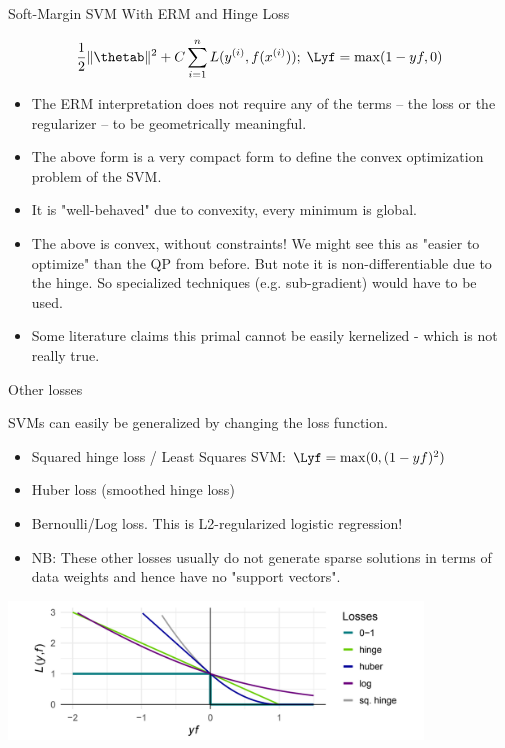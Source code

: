 \begin{vbframe}{Soft-Margin SVM With ERM and Hinge Loss}
\framebreak

  $$ \frac{1}{2} \|\thetab\|^2 + C \sumin \Lxyi ;\; \Lyf = \max(1-yf, 0)$$
\begin{itemize}
 \item  The ERM interpretation does not require any of the terms -- the loss or the regularizer -- to be geometrically meaningful.
  \item The above form is a very compact form to define the convex optimization problem of the SVM. 
  \item It is "well-behaved" due to convexity, every minimum is global.
  \item The above is convex, without constraints! We might see this as "easier to optimize" than the QP from before. But note it is non-differentiable due to the hinge. 
    So specialized techniques (e.g. sub-gradient) would have to be used. 
  \item Some literature claims this primal cannot be easily kernelized - which is not really true.
  \end{itemize}
\end{vbframe}

\begin{vbframe}{Other losses}

  SVMs can easily be generalized by changing the loss function.
  \begin{itemize}
    \item Squared hinge loss / Least Squares SVM: $\Lyf = \max(0, (1 - yf)^2)$ 
    \item Huber loss (smoothed hinge loss)
    \item Bernoulli/Log loss. This is L2-regularized logistic regression!
    \item NB: These other losses usually do not generate sparse solutions in terms of 
      data weights and hence have no "support vectors".
  \end{itemize}


\begin{center}
\includegraphics[width = 11cm ]{figure_man/other-losses.png} \\
\end{center}


\end{vbframe}


\endlecture




